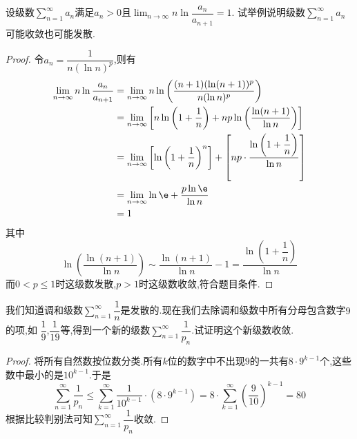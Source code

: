 \documentclass{ctexart}
\begin{document}
\begin{problem}[L.9.5]
    设级数$\displaystyle\sum_{n=1}^\infty a_n$满足$a_n>0$且$\displaystyle\lim_{n\to\infty}n\ln\dfrac{a_n}{a_{n+1}}=1$.%
    试举例说明级数$\displaystyle\sum_{n=1}^\infty a_n$可能收敛也可能发散.
\end{problem}
\begin{proof}
    令$a_n=\dfrac1{n\left(\ln n\right)^p}$,则有
    \[\begin{aligned}
        \lim_{n\to\infty}n\ln\dfrac{a_n}{a_{n+1}}
        &= \lim_{n\to\infty}n\ln\left(\dfrac{(n+1)(\ln(n+1))^p}{n(\ln n)^p}\right) \\
        &= \lim_{n\to\infty}\left[n\ln\left(1+\dfrac1n\right)+np\ln\left(\dfrac{\ln(n+1)}{\ln n}\right)\right] \\
        &= \lim_{n\to\infty}\left[\ln\left(1+\dfrac1n\right)^n\right]+\left[np\cdot\dfrac{\ln\left(1+\dfrac1n\right)}{\ln n}\right] \\
        &= \lim_{n\to\infty}\ln\e+\dfrac{p\ln\e}{\ln n} \\
        &= 1
    \end{aligned}\]
    其中
    \[\ln\left(\dfrac{\ln(n+1)}{\ln n}\right)\sim\dfrac{\ln(n+1)}{\ln n}-1=\dfrac{\ln\left(1+\dfrac1n\right)}{\ln n}\]
    而$0<p\leqslant1$时这级数发散,$p>1$时这级数收敛,符合题目条件.
\end{proof}
\begin{problem}[L.9.6]
    我们知道调和级数$\displaystyle\sum_{n=1}^\infty\dfrac1n$是发散的.现在我们去除调和级数中所有分母包含数字$9$的项,如%
    $\dfrac19$,$\dfrac1{19}$等,得到一个新的级数$\displaystyle\sum_{n=1}^\infty\dfrac{1}{p_n}$.试证明这个新级数收敛.
\end{problem}
\begin{proof}
    将所有自然数按位数分类.所有$k$位的数字中不出现$9$的一共有$8\cdot9^{k-1}$个,这些数中最小的是$10^{k-1}$.于是
    \[\sum_{n=1}^\infty\dfrac{1}{p_n}\leqslant\sum_{k=1}^\infty\dfrac{1}{10^{k-1}}\cdot\left(8\cdot9^{k-1}\right)
    =8\cdot\sum_{k=1}^\infty\left(\dfrac{9}{10}\right)^{k-1}=80\]
    根据比较判别法可知$\displaystyle\sum_{n=1}^\infty\dfrac{1}{p_n}$收敛.
\end{proof}
\end{document}
